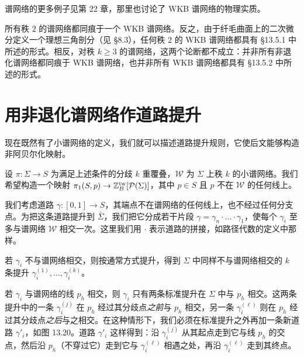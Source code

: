 
\begin{remark}[13.26]
谱网络的更多例子见第 22 章，那里也讨论了 WKB 谱网络的物理实质。
\end{remark}

\begin{remark}[13.27]
所有秩 $2$ 的谱网络都同痕于一个 WKB 谱网络。反之，由于纤毛曲面上的二次微分定义一个理想三角剖分（见 §8.3），任何秩 $2$ 的 WKB 谱网络都具有 §13.5.1 中所述的形式。相反，对秩 $k\ge3$ 的谱网络，这两个论断都不成立：并非所有非退化谱网络都同痕于 WKB 谱网络，也并非所有 WKB 谱网络都具有 §13.5.2 中所述的形式。
\end{remark}

\section{用非退化谱网络作道路提升}

现在既然有了小谱网络的定义，我们就可以描述道路提升规则，它使后文能够构造非阿贝尔化映射。

设 $\pi\colon\Sigma\to S$ 为满足上述条件的分歧 $k$ 重覆叠，$\mathcal{W}$ 为 $\Sigma$ 上秩 $k$ 的小谱网络。我们希望构造一个映射 $\pi_1(S,p)\to\mathbb{Z}^{\mathrm{tw}}_B[\mathcal{P}(\Sigma)]$，其中 $p\in S$ 且 $p$ 不在 $\mathcal{W}$ 的任何线上。

我们考虑道路 $\gamma\colon[0,1]\to S$，其端点不在谱网络的任何线上，也不经过任何分支点。为把这条道路提升到 $\bar\Sigma$，我们把它分成若干片段 $\gamma=\gamma_n\cdot\ldots\cdot\gamma_1$，使每个 $\gamma_i$ 至多与谱网络 $\mathcal{W}$ 相交一次。这里我们用 $\cdot$ 表示道路的拼接，如路径代数的定义中那样。

若 $\gamma_i$ 不与谱网络相交，则按通常方式提升，得到 $\Sigma$ 中同样不与谱网络相交的 $k$ 条提升 $\gamma_i^{(1)},\dots,\gamma_i^{(k)}$。

若 $\gamma_i$ 与谱网络的线 $p_h$ 相交，则 $\gamma_i$ 只有两条标准提升在 $\Sigma$ 中与 $p_h$ 相交。这两条提升中的一条 $\gamma_i^{(j)}$ 在 $p_h$ 经过其分歧点\emph{之前}与 $p_h$ 相交，另一条 $\gamma_i^{(\ell)}$ 则在 $p_h$ 经过其分歧点\emph{之后}与之相交。在这种情形下，我们必须在标准提升之外再加一条新道路 $\gamma'_i$，如图 13.20。道路 $\gamma'_i$ 这样得到：沿 $\gamma_i^{(j)}$ 从其起点走到它与线 $p_h$ 的交点，然后沿 $p_h$（不穿过它）走到它与 $\gamma_i^{(\ell)}$ 相遇之处，再沿 $\gamma_i^{(\ell)}$ 走到其终点。

